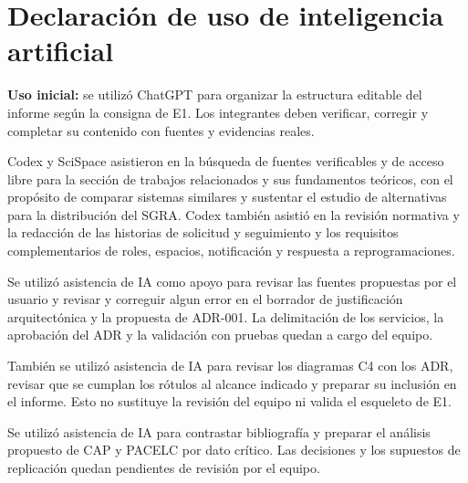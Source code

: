 \section{Declaración de uso de inteligencia artificial}
\textbf{Uso inicial:} se utilizó ChatGPT para organizar la estructura editable del informe según la consigna de E1. Los integrantes deben verificar, corregir y completar su contenido con fuentes y evidencias reales.

Codex y SciSpace asistieron en la búsqueda de fuentes verificables y de acceso libre para la sección de trabajos relacionados y sus fundamentos teóricos, con el propósito de comparar sistemas similares y sustentar el estudio de alternativas para la distribución del SGRA. Codex también asistió en la revisión normativa y la redacción de las historias de solicitud y seguimiento y los requisitos complementarios de roles, espacios, notificación y respuesta a reprogramaciones.

Se utilizó asistencia de IA como apoyo para revisar las fuentes propuestas por el usuario y revisar y correguir algun error en el borrador de justificación arquitectónica y la propuesta de ADR-001. La delimitación de los servicios, la aprobación del ADR y la validación con pruebas quedan a cargo del equipo.

También se utilizó asistencia de IA para revisar los diagramas C4 con los ADR, revisar que se cumplan los rótulos al alcance indicado y preparar su inclusión en el informe. Esto no sustituye la revisión del equipo ni valida el esqueleto de E1.

Se utilizó asistencia de IA para contrastar bibliografía y preparar el análisis propuesto de CAP y PACELC por dato crítico. Las decisiones y los supuestos de replicación quedan pendientes de revisión por el equipo.
